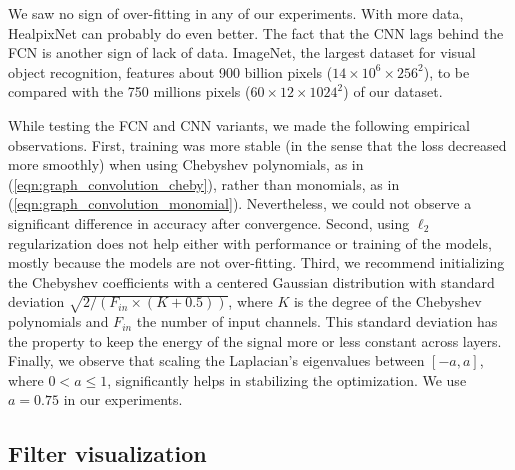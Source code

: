 \documentclass[final,twocolumn,3p,times,sort&compress]{elsarticle}
\newcommand{\todo}[1]{{\color[rgb]{.6,.1,.6}{#1}}}
\newcommand{\eqnref}[1]{(\ref{eqn:#1})}
\newcommand{\1}{\b{1}}              %
\newcommand{\0}{\b{0}}              %
\begin{document}
We saw no sign of over-fitting in any of our experiments.
With more data, HealpixNet can probably do even better.
The fact that the CNN lags behind the FCN is another sign of lack of data.
ImageNet, the largest dataset for visual object recognition, features about 900 billion pixels ($14 \times 10^6 \times 256^2$), to be compared with the 750 millions pixels ($60 \times 12 \times 1024^2$) of our dataset.

While testing the FCN and CNN variants, we made the following empirical observations.
First, training was more stable (in the sense that the loss decreased more smoothly) when using Chebyshev polynomials, as in \eqnref{graph_convolution_cheby}, rather than monomials, as in \eqnref{graph_convolution_monomial}.
Nevertheless, we could not observe a significant difference in accuracy after convergence.
Second, using $\ell_2$ regularization does not help either with performance or training of the models, mostly because the models are not over-fitting.
Third, we recommend initializing the Chebyshev coefficients with a centered Gaussian distribution with standard deviation $\sqrt{2/(F_{in} \times (K + 0.5))}$, where $K$ is the degree of the Chebyshev polynomials and $F_{in}$ the number of input channels. This standard deviation has the property to keep the energy of the signal more or less constant across layers. \todo{Nath: cite the paper you read about that?}
Finally, we observe that scaling the Laplacian's eigenvalues between $[-a, a]$, where $0 < a \leq 1$, significantly helps in stabilizing the optimization. We use $a = 0.75$ in our experiments.

\subsection{Filter visualization}
\end{document}
